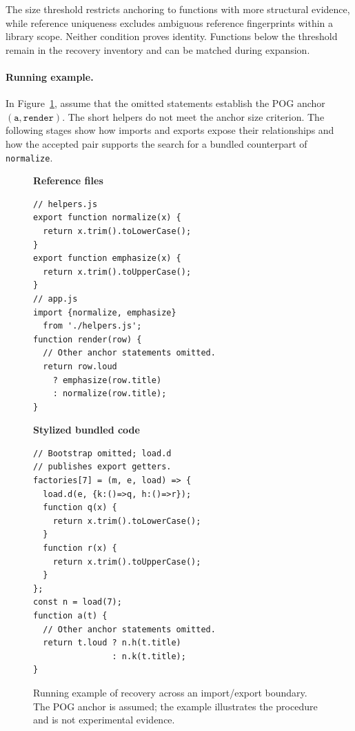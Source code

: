 The size threshold restricts anchoring to functions with more structural evidence, while reference uniqueness excludes ambiguous reference fingerprints within a library scope. Neither condition proves identity. Functions below the threshold remain in the recovery inventory and can be matched during expansion.

\paragraph{Running example.}
In Figure~\ref{fig:recovery-example}, assume that the omitted statements establish the POG anchor $(\texttt{a},\texttt{render})$. The short helpers do not meet the anchor size criterion. The following stages show how imports and exports expose their relationships and how the accepted pair supports the search for a bundled counterpart of \texttt{normalize}.

\begin{figure}[htbp]
\centering
\begin{minipage}[t]{.47\linewidth}
\small\textbf{Reference files}
\begin{lstlisting}[basicstyle=\ttfamily\scriptsize]
// helpers.js
export function normalize(x) {
  return x.trim().toLowerCase();
}
export function emphasize(x) {
  return x.trim().toUpperCase();
}
// app.js
import {normalize, emphasize}
  from './helpers.js';
function render(row) {
  // Other anchor statements omitted.
  return row.loud
    ? emphasize(row.title)
    : normalize(row.title);
}
\end{lstlisting}
\end{minipage}\hfill
\begin{minipage}[t]{.49\linewidth}
\small\textbf{Stylized bundled code}
\begin{lstlisting}[basicstyle=\ttfamily\scriptsize]
// Bootstrap omitted; load.d
// publishes export getters.
factories[7] = (m, e, load) => {
  load.d(e, {k:()=>q, h:()=>r});
  function q(x) {
    return x.trim().toLowerCase();
  }
  function r(x) {
    return x.trim().toUpperCase();
  }
};
const n = load(7);
function a(t) {
  // Other anchor statements omitted.
  return t.loud ? n.h(t.title)
                : n.k(t.title);
}
\end{lstlisting}
\end{minipage}
\caption{Running example of recovery across an import/export boundary. The POG anchor is assumed; the example illustrates the procedure and is not experimental evidence.}
\label{fig:recovery-example}
\end{figure}


